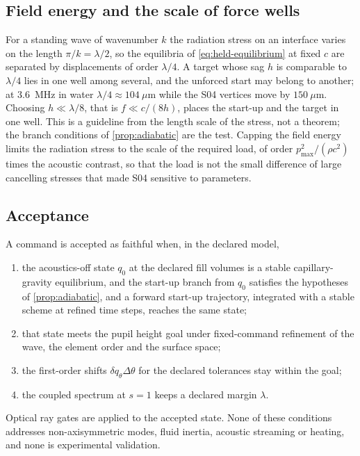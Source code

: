 \subsection{Field energy and the scale of force wells}
For a standing wave of wavenumber $k$ the radiation stress on an interface
varies on the length $\pi/k=\lambda/2$, so the equilibria of
\cref{eq:held-equilibrium} at fixed $c$ are separated by displacements of order
$\lambda/4$. A target whose sag $h$ is comparable to $\lambda/4$ lies in one
well among several, and the unforced start may belong to another; at
3.6~MHz in water $\lambda/4\approx104~\mu$m while the S04 vertices move by
$150~\mu$m. Choosing $h\ll\lambda/8$, that is $f\ll c/(8h)$, places the
start-up and the target in one well. This is a guideline from the length
scale of the stress, not a theorem; the branch conditions of
\cref{prop:adiabatic} are the test. Capping the field energy limits the
radiation stress to the scale of the required load, of order
$p_{\max}^2/(\rho c^2)$ times the acoustic contrast, so that the load is not
the small difference of large cancelling stresses that made S04 sensitive
to parameters.

\subsection{Acceptance}
A command is accepted as faithful when, in the declared model,
\begin{enumerate}
 \item the acoustics-off state $q_0$ at the declared fill volumes is a stable
 capillary-gravity equilibrium, and the start-up branch from $q_0$ satisfies the hypotheses of
 \cref{prop:adiabatic}, and a forward start-up trajectory, integrated with a
 stable scheme at refined time steps, reaches the same state;
 \item that state meets the pupil height goal under fixed-command refinement of
 the wave, the element order and the surface space;
 \item the first-order shifts $\delta q_\theta\Delta\theta$ for the declared
 tolerances stay within the goal;
 \item the coupled spectrum at $s=1$ keeps a declared margin $\lambda$.
\end{enumerate}
Optical ray gates are applied to the accepted state. None of these conditions
addresses non-axisymmetric modes, fluid inertia, acoustic streaming or
heating, and none is experimental validation.
